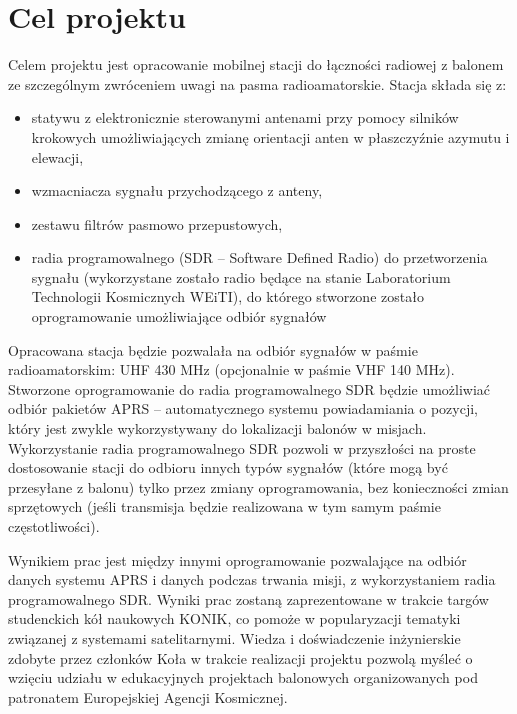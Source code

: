 \section{Cel projektu}

Celem projektu jest opracowanie mobilnej stacji do łączności radiowej z balonem ze szczególnym zwróceniem uwagi na pasma radioamatorskie. Stacja składa się z:
\begin{itemize}
    \item statywu z elektronicznie sterowanymi antenami przy pomocy silników krokowych umożliwiających zmianę orientacji anten w płaszczyźnie azymutu i elewacji,
    \item wzmacniacza sygnału przychodzącego z anteny,
    \item zestawu filtrów pasmowo przepustowych,
    \item radia programowalnego (SDR – Software Defined Radio) do przetworzenia sygnału (wykorzystane zostało radio będące na stanie Laboratorium Technologii Kosmicznych WEiTI), do którego stworzone zostało oprogramowanie umożliwiające odbiór sygnałów
\end{itemize}  

	Opracowana stacja będzie pozwalała na odbiór sygnałów w paśmie radioamatorskim: UHF 430 MHz (opcjonalnie w paśmie VHF 140 MHz). 
	Stworzone oprogramowanie do radia programowalnego SDR będzie umożliwiać odbiór pakietów APRS – automatycznego systemu powiadamiania o pozycji, który jest zwykle wykorzystywany do lokalizacji balonów w misjach. Wykorzystanie radia programowalnego SDR pozwoli w przyszłości na proste dostosowanie stacji do odbioru innych typów sygnałów (które mogą być przesyłane z  balonu) tylko przez zmiany oprogramowania, bez konieczności zmian sprzętowych (jeśli transmisja będzie realizowana w tym samym paśmie częstotliwości).

	Wynikiem prac jest między innymi oprogramowanie pozwalające na odbiór danych systemu APRS i danych podczas trwania misji, z wykorzystaniem radia programowalnego SDR.
	Wyniki prac zostaną zaprezentowane w trakcie targów studenckich kół naukowych KONIK, co pomoże w popularyzacji tematyki związanej z systemami satelitarnymi.
	Wiedza i doświadczenie inżynierskie  zdobyte przez członków Koła w trakcie realizacji projektu pozwolą myśleć o wzięciu udziału w edukacyjnych projektach balonowych organizowanych pod patronatem Europejskiej Agencji Kosmicznej.